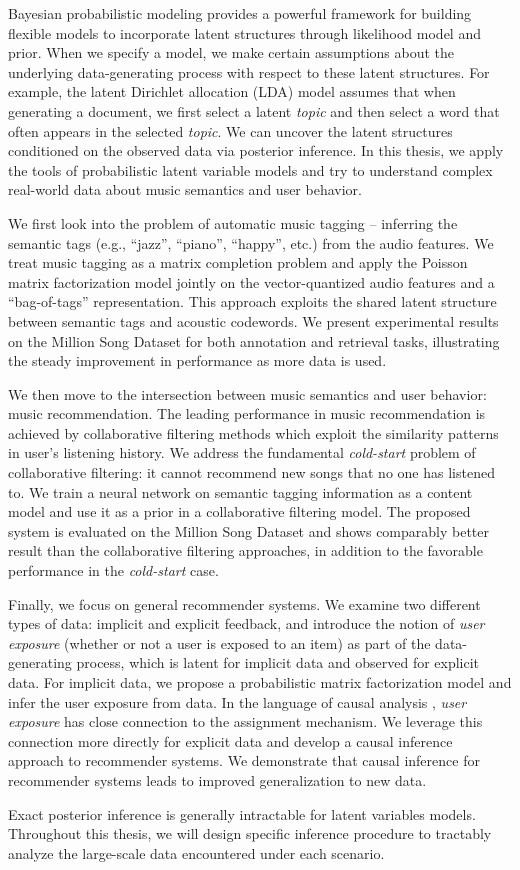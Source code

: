 
Bayesian probabilistic modeling provides a powerful framework for building flexible models to incorporate latent structures through likelihood model and prior. When we specify a model, we make certain assumptions about the underlying data-generating process with respect to these latent structures. For example, the latent Dirichlet allocation (LDA) model assumes that when generating a document, we first select a latent \textit{topic} and then select a word that often appears in the selected \textit{topic}. We can uncover the latent structures conditioned on the observed data via posterior inference. In this thesis, we apply the tools of probabilistic latent variable models and try to understand complex real-world data about music semantics and user behavior. 

We first look into the problem of automatic music tagging -- inferring the semantic tags (e.g., ``jazz'', ``piano'', ``happy'', etc.) from the audio features. We treat music tagging as a matrix completion problem and apply the Poisson matrix factorization model jointly on the vector-quantized audio features and a ``bag-of-tags'' representation. This approach exploits the shared latent structure between semantic tags and acoustic codewords. We present experimental results on the Million Song Dataset for both annotation and retrieval tasks, illustrating the steady improvement in performance as more data is used. 

We then move to the intersection between music semantics and user behavior: music recommendation. The leading performance in music recommendation is achieved by collaborative filtering methods which exploit the similarity patterns in user's listening history. We address the fundamental \textit{cold-start} problem of collaborative filtering: it cannot recommend new songs that no one has listened to. We train a neural network on semantic tagging information as a content model and use it as a prior in a collaborative filtering model. The proposed system is evaluated on the Million Song Dataset and shows comparably better result than the collaborative filtering approaches, in addition to the favorable performance in the \textit{cold-start} case. 

Finally, we focus on general recommender systems. We examine two different types of data: implicit and explicit feedback, and introduce the notion of \textit{user exposure} (whether or not a user is exposed to an item) as part of the data-generating process, which is latent for implicit data and observed for explicit data. For implicit data, we propose a probabilistic matrix factorization model and infer the user exposure from data. In the language of causal analysis \citep{imbens2015causal}, \textit{user exposure} has close connection to the assignment mechanism. We leverage this connection more directly for explicit data and develop a causal inference approach to recommender systems. We demonstrate that causal inference for recommender systems leads to improved generalization to new data.

Exact posterior inference is generally intractable for latent variables models. Throughout this thesis, we will design specific inference procedure to tractably analyze the large-scale data encountered under each scenario. 

